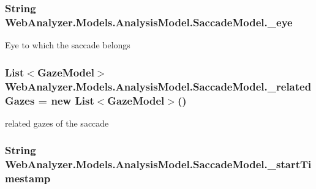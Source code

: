 \subsubsection[{\+\_\+eye}]{\setlength{\rightskip}{0pt plus 5cm}String Web\+Analyzer.\+Models.\+Analysis\+Model.\+Saccade\+Model.\+\_\+eye\hspace{0.3cm}{\ttfamily [private]}}\label{class_web_analyzer_1_1_models_1_1_analysis_model_1_1_saccade_model_ad26094ad3aa83c781182f2bce5d0fb13}


Eye to which the saccade belongs 

\hypertarget{class_web_analyzer_1_1_models_1_1_analysis_model_1_1_saccade_model_aaa7e07a49ff69d723d0098ea49d02a0a}{}
\subsubsection[{\+\_\+related\+Gazes}]{\setlength{\rightskip}{0pt plus 5cm}List$<${\bf Gaze\+Model}$>$ Web\+Analyzer.\+Models.\+Analysis\+Model.\+Saccade\+Model.\+\_\+related\+Gazes = new List$<${\bf Gaze\+Model}$>$()\hspace{0.3cm}{\ttfamily [private]}}\label{class_web_analyzer_1_1_models_1_1_analysis_model_1_1_saccade_model_aaa7e07a49ff69d723d0098ea49d02a0a}


related gazes of the saccade 

\hypertarget{class_web_analyzer_1_1_models_1_1_analysis_model_1_1_saccade_model_aba79dc37019465bcc958062438713351}{}
\subsubsection[{\+\_\+start\+Timestamp}]{\setlength{\rightskip}{0pt plus 5cm}String Web\+Analyzer.\+Models.\+Analysis\+Model.\+Saccade\+Model.\+\_\+start\+Timestamp\hspace{0.3cm}{\ttfamily [private]}}\label{class_web_analyzer_1_1_models_1_1_analysis_model_1_1_saccade_model_aba79dc37019465bcc958062438713351}


